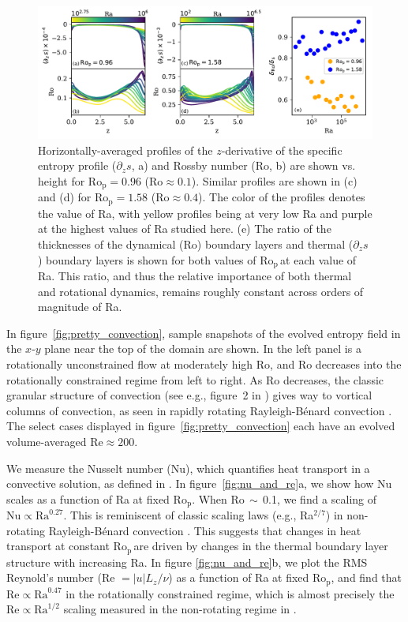 \documentclass[twocolumn, amsmath, amsfonts, amssymb]{aastex62}
\newcommand{\RB}{Rayleigh-B\'{e}nard }
\newcommand{\pro}{\ensuremath{\text{Ro}_{\text{p}}}}
\begin{document}
\begin{figure}[ht!]
    \includegraphics[width=\textwidth]{./figs/boundary_layers.pdf}
    \caption{Horizontally-averaged profiles of the $z$-derivative of 
    the specific entropy profile ($\partial_z s$, a) and Rossby number (Ro, b) 
    are shown vs. height for $\pro = 0.96$ ($\text{Ro} \approx 0.1$). 
    Similar profiles are shown in (c) and (d) for $\pro = 1.58$ ($\text{Ro} \approx 0.4$). The color of the profiles
    denotes the value of Ra, with yellow profiles being at very low Ra and purple at the highest
    values of Ra studied here.
    (e) The ratio of the thicknesses of the dynamical (Ro) boundary layers and 
    thermal ($\partial_z s$) boundary layers is shown for both values of \pro$\,$at each value of Ra.
    This ratio, and thus the relative importance of both thermal and rotational dynamics,
	remains roughly constant across orders of magnitude of Ra.
    \label{fig:profiles_and_bls} }
\end{figure}

In figure~\ref{fig:pretty_convection}, sample snapshots
of the evolved entropy field in the $x$-$y$ plane near the top of the domain are shown. 
In the left panel is a rotationally unconstrained flow at moderately high
Ro, and Ro decreases into the rotationally constrained regime from left to right.
As Ro decreases, the
classic granular structure of convection (see e.g., figure~2 in \AB) gives way to vortical
columns of convection, as seen in rapidly rotating \RB convection \citep{stellmach&all2014}.
The select cases displayed in figure~\ref{fig:pretty_convection} each have an evolved volume-averaged
$\text{Re} \approx 200$.

We measure the Nusselt number (Nu), which quantifies heat transport in a convective
solution, as defined in \AB.
In figure~\ref{fig:nu_and_re}a, we show how Nu scales as a function
of Ra at fixed \pro. When Ro$\,\sim\,$0.1,
we find a scaling of $\text{Nu} \propto \text{Ra}^{0.27}$. This is reminiscent of
classic scaling laws (e.g., Ra$^{2/7}$) in non-rotating \RB convection \citep{ahlers&all2009}.
This suggests that changes in heat transport at constant \pro$\,$are driven by
changes in the thermal boundary layer structure with increasing Ra.
In figure \ref{fig:nu_and_re}b, we plot the RMS Reynold's
number (Re $= |u| L_z / \nu$) as a function of Ra at fixed \pro, and find that 
$\text{Re} \propto \text{Ra}^{0.47}$ in the rotationally constrained regime,
which is almost precisely the $\text{Re} \propto \text{Ra}^{1/2}$ scaling measured
in the non-rotating regime in \AB.
\end{document}
